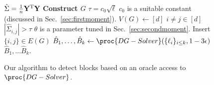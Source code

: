 \begin{figure}
{\small
    \centering
    \begin{codebox}
\li $\hat \Sigma = \frac{1}{n}\mathbf{Y}^{\mathrm{T}} \mathbf{Y}$
\li \Comment \textbf{Construct $G$}
\li $\tau = c_0 \sqrt \ell$ \Comment $c_0$ is a suitable constant (discussed in Sec.~\ref{sec:firstmoment}).
\li $V(G) \gets [d]$
\li \For $i \neq j \in [d]$
\li \Do \If $|\hat \Sigma_{i,j}| > \tau$ \Comment $\theta$ is a parameter tuned in Sec.~\ref{sec:secondmoment}.
\li \Then  Insert $\{i, j\} \in E(G)$
\End
\End
\li $\hat B_1, \dots, \hat B_{k} \gets \proc{DG-Solver}(\{\ell_i\}_{i \leq k}, 1- 3\epsilon)$
\li \Return $\hat B_1, \dots \hat B_k$. 
\end{codebox}
}
\caption{Our algorithm to detect blocks based on an oracle access to $\proc{DG-Solver}$.}
    \label{fig:cluster_algo}
\end{figure}
